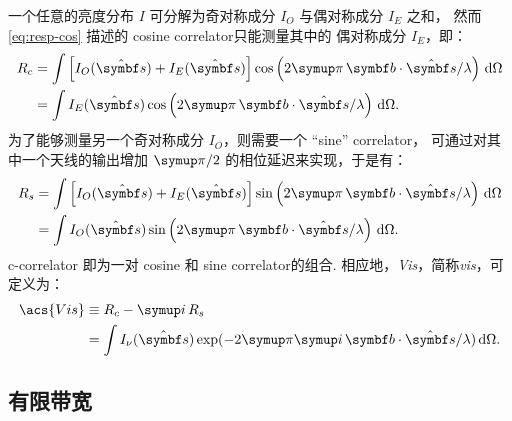 一个任意的亮度分布 $I$ 可分解为奇对称成分 $I_O$ 与偶对称成分 $I_E$ 之和，
然而\autoref{eq:resp-cos} 描述的 cosine \ac{correlator}只能测量其中的
偶对称成分 $I_E$，即：
\begin{align}
  R_c & = \int \left[ I_O(\hat{\B{s}}) + I_E(\hat{\B{s}}) \right]
      \cos \left( 2\Cpi\, \B{b}\cdot\hat{\B{s}} / \lambda \right)
      \,\D{\Omega}  \\
    & = \int I_E(\hat{\B{s}}) \cos \left(
      2\Cpi\, \B{b}\cdot\hat{\B{s}} / \lambda \right) \,\D{\Omega}.
\end{align}
为了能够测量另一个奇对称成分 $I_O$，则需要一个 \enquote{sine} \ac{correlator}，
可通过对其中一个天线的输出增加 $\Cpi/2$ 的相位延迟来实现，于是有：
\begin{align}
  R_s & = \int \left[ I_O(\hat{\B{s}}) + I_E(\hat{\B{s}}) \right]
      \sin \left( 2\Cpi\, \B{b}\cdot\hat{\B{s}} / \lambda \right)
      \,\D{\Omega}  \\
    & = \int I_O(\hat{\B{s}}) \sin \left(
      2\Cpi\, \B{b}\cdot\hat{\B{s}} / \lambda \right) \,\D{\Omega}.
\end{align}
\ac{c-correlator} 即为一对 cosine 和 sine \ac{correlator}的组合.
相应地，\emph{\acf{Vis}}，简称\emph{\ac{vis}}，可定义为：
\begin{align}
  \label{eq:vis}
  \acs{Vis}
    & \equiv R_c - \Ci\, R_s  \\
    & = \int I_{\nu}(\hat{\B{s}}) \exp
      (-2\Cpi\Ci\, \B{b}\cdot\hat{\B{s}} / \lambda) \,\D{\Omega}.
\end{align}

\subsection{有限带宽}

